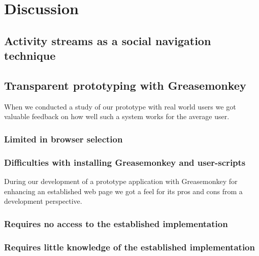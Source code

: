 \clearpage
\clearpage

\section{Discussion}

\subsection{Activity streams as a social navigation technique}

\subsection{Transparent prototyping with Greasemonkey}


When we conducted a study of our prototype with real world users
we got valuable feedback on how well such a system works for the average user.

\subsubsection{Limited in browser selection}


\subsubsection{Difficulties with installing Greasemonkey and user-scripts}


\parabreak

During our development of a prototype application with Greasemonkey for
enhancing an established web page we got a feel for its pros and cons from a
development perspective.

\subsubsection{Requires no access to the established implementation}

\subsubsection{Requires little knowledge of the established implementation}

